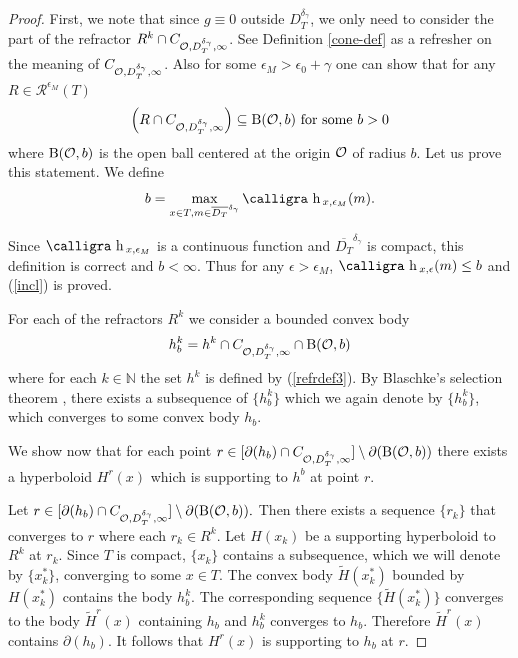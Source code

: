 \documentclass[review]{elsarticle}
\newcommand{\h}{\text{\calligra h}\,}
\begin{document}
\begin{proof}
First, we note that since $g \equiv 0$ outside $D_T^{\delta_\gamma}$, we only need to consider the part of the refractor $R^k\cap C_{\mathcal{O},D_T^{\delta_\gamma},\infty}$. See Definition \ref{cone-def} as a refresher on the meaning of $C_{\mathcal{O},D_T^{\delta_\gamma},\infty}$. Also for some $\epsilon_M > \epsilon_0+\gamma$ one can show that for any $R \in \mathcal{R}^{\epsilon_M} (T )$
\begin{equation}\label{incl}
    \left(R\cap C_{\mathcal{O},D_T^{\delta_\gamma},\infty}\right) \subseteq \textnormal{B}(\mathcal{O}, b) \textnormal{ for some } b >0
\end{equation}
where $\textnormal{B}(\mathcal{O}, b)$ is the open ball centered at the origin $\mathcal{O}$ of radius $b$. Let us prove this statement. We define
\begin{equation}
    b = \max_{x\in T,m\in \overline{D_T}^{\delta_\gamma}}\h_{x,\epsilon_M}(m).
\end{equation}

Since $\h_{x,\epsilon_M}$ is a continuous function and $\overline{D_T}^{\delta_\gamma}$ is compact, this definition is correct and $b < \infty.$ Thus for any $\epsilon > \epsilon_M$, $\h_{x,\epsilon}(m)\le b$ and (\ref{incl}) is proved.
 
For each of the refractors $R^k$ we consider a bounded convex body
\begin{equation}
    h_b^k =h^k\cap C_{\mathcal{O},D_T^{\delta_\gamma},\infty}\cap\textnormal{B}(\mathcal{O}, b)
\end{equation}
where for each $k\in \mathbb{N}$ the set $h^k$ is defined by (\ref{refrdef3}). By Blaschke’s selection theorem \cite{schneider_2013}, there exists a subsequence of $\{h_b^k\}$ which we again denote by $\{h_b^k\}$, which converges to some convex body $h_b.$

We show now that for each point $r \in [\partial( h_b) \cap C_{\mathcal{O},D_T^{\delta_\gamma},\infty}]\setminus \partial(\textnormal{B}(\mathcal{O}, b))$ there exists a
hyperboloid $H^r(x)$ which is supporting to $h^b$ at point $r.$

Let $r \in [\partial( h_b) \cap C_{\mathcal{O},D_T^{\delta_\gamma},\infty}]\setminus \partial(\textnormal{B}(\mathcal{O}, b)).$ Then there exists a sequence $\{r_k\}$ that converges to $r$ where each $r_k \in R^k$. Let $H(x_k)$ be a supporting hyperboloid to $R^k$ at $r_k$. Since $T$ is compact, $\{x_k\}$ contains a subsequence, which we will denote by $\{x_k^*\}$, converging to some $x \in T$. The convex body $\tilde{H} ( x_k^*)$ bounded by $H (x_k^*)$ contains the body $h_b^k$. The corresponding sequence $\{\tilde{H} (x_k^*)\}$ converges to the body $\tilde{H}^r(x)$ containing $h_b$ and $h_b^k$ converges to $h_b$. Therefore $\tilde{H}^r(x)$ contains $\partial (h_b)$. It follows that $H^r(x)$ is supporting to $h_b$ at $r$.


\end{proof}
\end{document}
